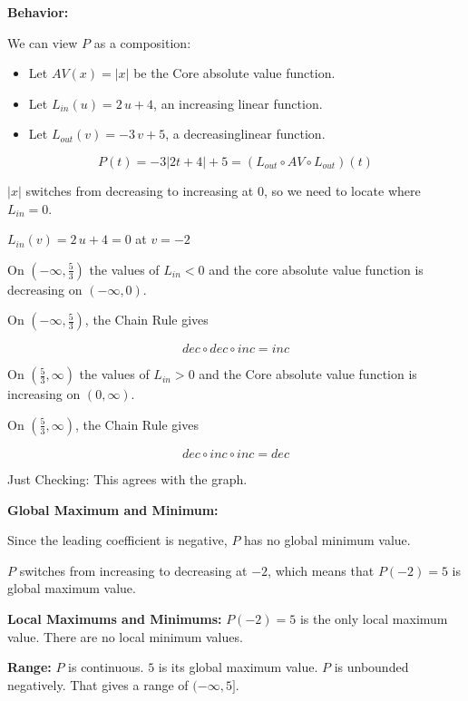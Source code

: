 \documentclass{ximera}
\begin{document}
\begin{example}
\textbf{Behavior:} 

We can view $P$ as a composition:



\begin{itemize}
\item Let $AV(x) = |x|$ be the Core absolute value function.
\item Let $L_{in}(u) = 2 \, u + 4$, an increasing linear function.
\item Let $L_{out}(v) = -3 \, v + 5$, a decreasinglinear function.
\end{itemize}


\[ P(t) = -3|2t+4|+5 = (L_{out} \circ AV \circ L_{out})(t)\]


$|x|$ switches from decreasing to increasing at $0$, so we need to locate where $L_{in} = 0$.


$L_{in}(v) = 2 \, u + 4 = 0$ at $v = -2$



On $\left( -\infty,  \frac{5}{3} \right)$ the values of $L_{in} < 0$ and the core absolute value function is decreasing on $(-\infty, 0)$. 

On $\left( -\infty,  \frac{5}{3} \right)$, the Chain Rule gives

\[ dec \circ dec \circ inc = inc \]





On $\left( \frac{5}{3}, \infty \right)$ the values of $L_{in} > 0$ and the Core absolute value function is increasing on $(0, \infty)$. 

On $\left( \frac{5}{3}, \infty \right)$, the Chain Rule gives

\[ dec \circ inc \circ inc = dec \]


Just Checking: This agrees with the graph.


\textbf{Global Maximum and Minimum:}

Since the leading coefficient is negative, $P$ has no global minimum value.

$P$ switches from increasing to decreasing at $-2$, which means that $P(-2) = 5$ is global maximum value.


\textbf{Local Maximums and Minimums:}  $P(-2) = 5$ is the only local maximum value. There are no local minimum values.

\textbf{Range:} $P$ is continuous.  $5$ is its global maximum value. $P$ is unbounded negatively.  That gives a range of $(-\infty, 5]$.


















\end{example}
\end{document}
